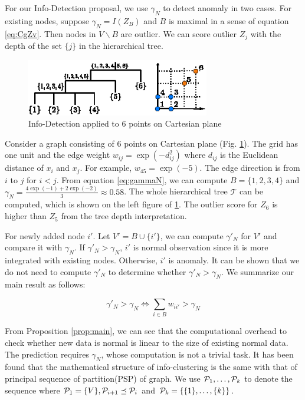 \documentclass[runningheads]{llncs}
\begin{document}
For our Info-Detection proposal, we use $\gamma_N$ to detect anomaly in two cases. For existing nodes, suppose $\gamma_N=I(Z_B)$ and $B$ is maximal in a sense of equation \eqref{eq:CgZv}. Then nodes in $V\backslash B$  are outlier. We can score outlier $Z_j$ with the depth of the set $\{j\}$ in the hierarchical tree. 
\begin{example}
	\begin{figure}[!ht]
		\centering
		\includegraphics[width=8cm]{pic/outlier_example.eps}
		\caption{Info-Detection applied to 6 points on Cartesian plane}\label{fig:ex}
	\end{figure}
	Consider a graph consisting of 6 points on Cartesian plane (Fig. \ref{fig:ex}). The grid has one unit and the edge weight $w_{ij} = \exp(-d_{ij}^2)$ where $d_{ij}$ is the Euclidean distance of $x_i$ and $x_j$. For example, $w_{45} = \exp(-5)$. The edge direction is from $i$ to $j$ for $i<j$. From equation \eqref{eq:gammaN}, we can compute $B=\{1,2,3,4\}$ and $\gamma_N = \frac{4\exp(-1)+2\exp(-2)}{3}\approx 0.58$. The whole hierarchical tree $\mathcal{T}$ can be computed, which is shown on the left figure of \ref{fig:ex}. The outlier score for $Z_6$ is higher than $Z_5$ from the tree depth interpretation.
\end{example}
For newly added node $i'$. Let $V'=B\cup \{i'\}$, we can compute $\gamma'_N$ for $V'$ and compare it with $\gamma_N$. If $\gamma'_N>\gamma_N$, $i'$ is normal observation since it is more integrated with existing nodes. Otherwise, $i'$ is anomaly. It can be shown that we do not need to compute $\gamma'_N$ to determine whether $\gamma'_N>\gamma_N$. We summarize our main result as follows:
\begin{proposition}\label{prop:main}
\begin{equation}
\gamma'_N > \gamma_N \iff  \sum_{i \in B} w_{ii'} > \gamma_N 
\end{equation}
\end{proposition}
From Proposition \ref{prop:main}, we can see that the computational overhead to check whether new data is normal is linear to the size of existing normal data. 
The prediction requires $\gamma_N$, whose computation is not a trivial task. It has been found that the mathematical structure of info-clustering is the same with that of principal sequence of partition(PSP) of graph. We use $\P_1, \dots, \P_k$ to denote the sequence where $\P_1 = \{V\}, \P_{i+1} \preceq \P_i$ and $\P_k = \{\{1\},\dots,\{k\}\}$.
\end{document}
